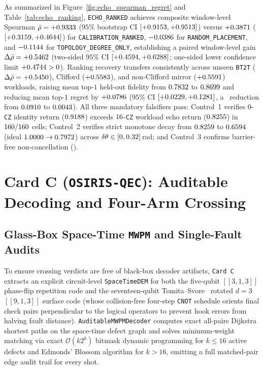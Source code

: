 \documentclass[aps,prx,twocolumn,superscriptaddress,nofootinbib]{revtex4-2}
\begin{document}
As summarized in Figure~\ref{fig:echo_spearman_regret} and Table~\ref{tab:echo_ranking}, \texttt{ECHO\_RANKED} achieves composite window-level Spearman $\bar{\rho} = +0.9333$ ($95\%$ bootstrap CI $[+0.9153, +0.9513]$) versus $+0.3871$ ($[+0.3159, +0.4644]$) for \texttt{CALIBRATION\_RANKED}, $-0.0386$ for \texttt{RANDOM\_PLACEMENT}, and $-0.1144$ for \texttt{TOPOLOGY\_DEGREE\_ONLY}, establishing a paired window-level gain $\Delta\bar{\rho} = +0.5462$ (two-sided $95\%$ CI $[+0.4594, +0.6288]$; one-sided lower confidence limit $+0.4744 > 0$). Ranking recovery transfers consistently across unseen \texttt{BT2T} ($\Delta\bar{\rho} = +0.5450$), Clifford ($+0.5583$), and non-Clifford mirror ($+0.5591$) workloads, raising mean top-$1$ held-out fidelity from $0.7832$ to $0.8699$ and reducing mean top-$1$ regret by $+0.0786$ ($95\%$ CI $[+0.0229, +0.1281]$, a \ecqRegretRatioX\ reduction from $0.0910$ to $0.0043$). All three mandatory falsifiers pass: Control~1 verifies $0$-\texttt{CZ} identity return ($0.9188$) exceeds $16$-\texttt{CZ} workload echo return ($0.8255$) in $160 / 160$ cells; Control~2 verifies strict monotone decay from $0.8259$ to $0.6594$ (ideal $1.0000 \to 0.7972$) across $\delta\theta \in [0, 0.32]$\,rad; and Control~3 confirms barrier-free non-cancellation (\ecqCardBVerdict).

\section{Card C (\texttt{OSIRIS-QEC}): Auditable Decoding and Four-Arm Crossing}

\subsection{Glass-Box Space-Time \texttt{MWPM} and Single-Fault Audits}
To ensure crossing verdicts are free of black-box decoder artifacts, \texttt{Card C} extracts an explicit circuit-level \texttt{SpaceTimeDEM} for both the five-qubit $[[3,1,3]]$ phase-flip repetition code and the seventeen-qubit Tomita--Svore~\cite{TomitaSvore2014} rotated $d = 3$ $[[9,1,3]]$ surface code (whose collision-free four-step \texttt{CNOT} schedule orients final check pairs perpendicular to the logical operators to prevent hook errors from halving fault distance). \texttt{AuditableMWPMDecoder} computes exact all-pairs Dijkstra shortest paths on the space-time defect graph and solves minimum-weight matching via exact $\mathcal{O}(k 2^k)$ bitmask dynamic programming for $k \le 16$ active defects and Edmonds' Blossom algorithm for $k > 16$, emitting a full matched-pair edge audit trail for every shot.
\end{document}
